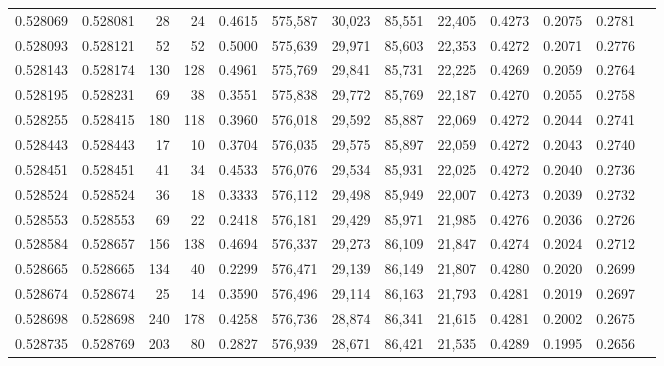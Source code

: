 \begin{tabular}{rrrrrrrrrrrrr}
0.528069 & 0.528081 &    28 &    24 &                                     0.4615 & 575,587 &  30,023 &  85,551 &  22,405 & 0.4273 & 0.2075 & 0.2781 \\
0.528093 & 0.528121 &    52 &    52 &                                     0.5000 & 575,639 &  29,971 &  85,603 &  22,353 & 0.4272 & 0.2071 & 0.2776 \\
0.528143 & 0.528174 &   130 &   128 &                                     0.4961 & 575,769 &  29,841 &  85,731 &  22,225 & 0.4269 & 0.2059 & 0.2764 \\
0.528195 & 0.528231 &    69 &    38 &                                     0.3551 & 575,838 &  29,772 &  85,769 &  22,187 & 0.4270 & 0.2055 & 0.2758 \\
0.528255 & 0.528415 &   180 &   118 &                                     0.3960 & 576,018 &  29,592 &  85,887 &  22,069 & 0.4272 & 0.2044 & 0.2741 \\
0.528443 & 0.528443 &    17 &    10 &                                     0.3704 & 576,035 &  29,575 &  85,897 &  22,059 & 0.4272 & 0.2043 & 0.2740 \\
0.528451 & 0.528451 &    41 &    34 &                                     0.4533 & 576,076 &  29,534 &  85,931 &  22,025 & 0.4272 & 0.2040 & 0.2736 \\
0.528524 & 0.528524 &    36 &    18 &                                     0.3333 & 576,112 &  29,498 &  85,949 &  22,007 & 0.4273 & 0.2039 & 0.2732 \\
0.528553 & 0.528553 &    69 &    22 &                                     0.2418 & 576,181 &  29,429 &  85,971 &  21,985 & 0.4276 & 0.2036 & 0.2726 \\
0.528584 & 0.528657 &   156 &   138 &                                     0.4694 & 576,337 &  29,273 &  86,109 &  21,847 & 0.4274 & 0.2024 & 0.2712 \\
0.528665 & 0.528665 &   134 &    40 &                                     0.2299 & 576,471 &  29,139 &  86,149 &  21,807 & 0.4280 & 0.2020 & 0.2699 \\
0.528674 & 0.528674 &    25 &    14 &                                     0.3590 & 576,496 &  29,114 &  86,163 &  21,793 & 0.4281 & 0.2019 & 0.2697 \\
0.528698 & 0.528698 &   240 &   178 &                                     0.4258 & 576,736 &  28,874 &  86,341 &  21,615 & 0.4281 & 0.2002 & 0.2675 \\
0.528735 & 0.528769 &   203 &    80 &                                     0.2827 & 576,939 &  28,671 &  86,421 &  21,535 & 0.4289 & 0.1995 & 0.2656 \\

\end{tabular}
